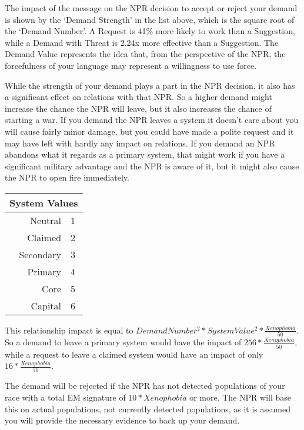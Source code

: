 \documentclass[10pt,a4paper,oneside]{article}
\begin{document}
The impact of the message on the NPR decision to accept or reject your demand is shown by the ‘Demand Strength’ in the list above, which is the square root of the ‘Demand Number’. A Request is 41\% more likely to work than a Suggestion, while a Demand with Threat is 2.24x more effective than a Suggestion. The Demand Value represents the idea that, from the perspective of the NPR, the forcefulness of your language may represent a willingness to use force.

While the strength of your demand plays a part in the NPR decision, it also has a significant effect on relations with that NPR. So a higher demand might increase the chance the NPR will leave, but it also increases the chance of starting a war. If you demand the NPR leaves a system it doesn't care about you will cause fairly minor damage, but you could have made a polite request and it may have left with hardly any impact on relations. If you demand an NPR abandons what it regards as a primary system, that might work if you have a significant military advantage and the NPR is aware of it, but it might also cause the NPR to open fire immediately.

\begin{center}
	\begin{tabular}{|r|l|}
		\hline
		\multicolumn{2}{|c|}{\textbf{System Values}} \\
		\hline
		Neutral & 1 \\
		\hline
		Claimed & 2 \\
		\hline
		Secondary & 3 \\
		\hline
		Primary& 4 \\
		\hline
		Core & 5 \\
		\hline
		Capital & 6 \\
		\hline
	\end{tabular}
\end{center}

This relationship impact is equal to \( Demand Number^{2} * System Value^{2} * \frac{Xenophobia}{50} \). So a demand to leave a primary system would have the impact of \( 256 * \frac{Xenophobia}{50} \), while a request to leave a claimed system would have an impact of only \( 16 * \frac{Xenophobia}{50} \).

The demand will be rejected if the NPR has not detected populations of your race with a total EM signature of \( 10 * Xenophobia \) or more. The NPR will base this on actual populations, not currently detected populations, as it is assumed you will provide the necessary evidence to back up your demand.
\end{document}
